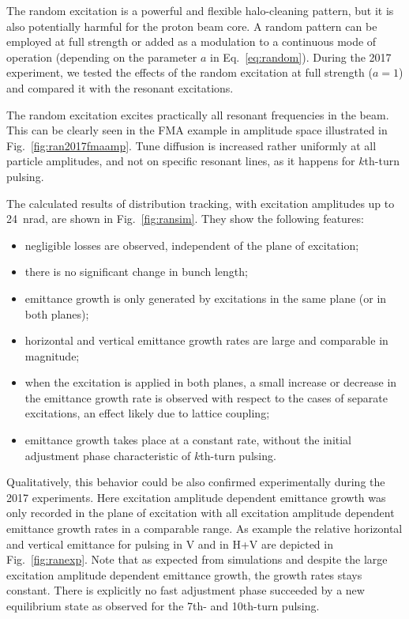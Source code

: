 \documentclass[%
 reprint,
 amsmath,amssymb,
 aps,
prstab,
longbibliography
]{revtex4-1}
\newcommand{\kthtp}{$k$th-turn pulsing}
\newcommand{\tenthtp}{10th-turn pulsing}
\begin{document}
The random excitation is a powerful and flexible halo-cleaning
pattern, but it is also potentially harmful for the proton beam
core. A random pattern can be employed at full strength or added as a
modulation to a continuous mode of operation (depending on the
parameter $a$ in Eq.~\ref{eq:random}). During the 2017 experiment, we
tested the effects of the random excitation at full strength ($a = 1$)
and compared it with the resonant excitations.

The random excitation excites practically all resonant frequencies in
the beam.  This can be clearly seen in the FMA example in amplitude
space illustrated in Fig.~\ref{fig:ran2017fmaamp}. Tune diffusion is
increased rather uniformly at all particle amplitudes, and not on
specific resonant lines, as it happens for \kthtp.

The calculated results of distribution tracking, with excitation
amplitudes up to 24~nrad, are shown in
Fig.~\ref{fig:ransim}. They show the following features:
%
\begin{itemize}
\item negligible losses are observed, independent of the plane of
  excitation;
\item there is no significant change in bunch length;
\item emittance growth is only generated by excitations in the same
  plane (or in both planes);
\item horizontal and vertical emittance growth rates are large and
  comparable in magnitude;
\item when the excitation is applied in both planes, a small increase
  or decrease in the emittance growth rate is observed with respect to
  the cases of separate excitations, an effect likely due to lattice
  coupling;
\item emittance growth takes place at a constant rate, without the
  initial adjustment phase characteristic of \kthtp.
\end{itemize}

Qualitatively, this behavior could be also confirmed experimentally
during the 2017 experiments. Here excitation amplitude dependent
emittance growth was only recorded in the plane of excitation with all
excitation amplitude dependent emittance growth rates in a comparable
range. As example the relative horizontal and vertical emittance for
pulsing in V and in H+V are depicted in Fig.~\ref{fig:ranexp}. Note
that as expected from simulations and despite the large excitation
amplitude dependent emittance growth, the growth rates stays
constant. There is explicitly no fast adjustment phase succeeded by a
new equilibrium state as observed for the 7th- and \tenthtp.
\end{document}
